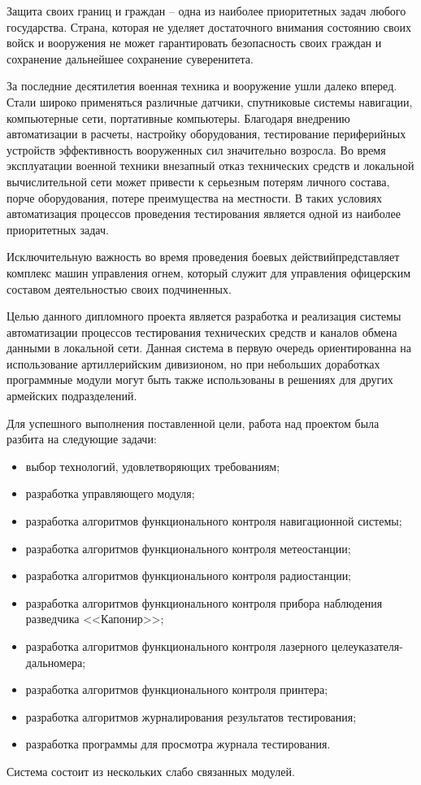 \label{sec:intro}

Защита своих границ и граждан -- одна из наиболее приоритетных задач любого государства.
Страна, которая не уделяет достаточного внимания состоянию своих войск и вооружения не может гарантировать безопасность своих граждан и сохранение дальнейшее сохранение суверенитета.

За последние десятилетия военная техника и вооружение ушли далеко вперед.
Стали широко применяться различные датчики, спутниковые системы навигации, компьютерные сети, портативные компьютеры.
Благодаря внедрению автоматизации в расчеты, настройку оборудования, тестирование периферийных устройств эффективность вооруженных сил значительно возросла.
Во время эксплуатации военной техники внезапный отказ технических средств и локальной вычислительной сети может привести
к серьезным потерям личного состава, порче оборудования, потере преимущества на местности.
В таких условиях автоматизация процессов проведения тестирования является одной из наиболее приоритетных задач.

Исключительную важность во время проведения боевых действий\break представляет комплекс машин управления огнем, который служит для управления офицерским составом деятельностью своих подчиненных.

Целью данного дипломного проекта является разработка и реализация системы автоматизации процессов тестирования технических средств и каналов обмена данными в локальной сети.
Данная система в первую очередь ориентированна на использование артиллерийским дивизионом, но при небольших доработках программные модули могут быть также использованы в решениях для других армейских подразделений.

Для успешного выполнения поставленной цели, работа над проектом была разбита на следующие задачи:
\begin{itemize}
    \item выбор технологий, удовлетворяющих требованиям;
    \item разработка управляющего модуля;
    \item разработка алгоритмов функционального контроля навигационной системы;
    \item разработка алгоритмов функционального контроля метеостанции;
    \item разработка алгоритмов функционального контроля радиостанции;
    \item разработка алгоритмов функционального контроля прибора наблюдения разведчика <<Капонир>>;
    \item разработка алгоритмов функционального контроля лазерного \break целеуказателя-дальномера;
    \item разработка алгоритмов функционального контроля принтера;
    \item разработка алгоритмов журналирования результатов тестирования;
    \item разработка программы для просмотра журнала тестирования.
\end{itemize}

Система состоит из нескольких слабо связанных модулей.
\clearpage

